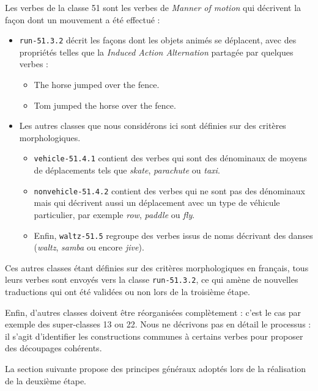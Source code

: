 Les verbes de la classe 51 sont les verbes de \textit{Manner of motion} qui
décrivent la façon dont un mouvement a été effectué :
\begin{itemize}
    \item \texttt{run-51.3.2} décrit les façons dont les objets animés se
        déplacent, avec des propriétés telles que la \textit{Induced Action
        Alternation} partagée par quelques verbes :
        \begin{itemize}
            \item The horse jumped over the fence.
            \item Tom jumped the horse over the fence.
        \end{itemize}
    \item Les autres classes que nous considérons ici sont définies sur des
        critères morphologiques.
        \begin{itemize}
            \item \texttt{vehicle-51.4.1} contient des verbes qui sont des
                dénominaux de moyens de déplacements tels que \textit{skate},
                \textit{parachute} ou \textit{taxi}.
            \item \texttt{nonvehicle-51.4.2} contient des verbes qui ne sont
                pas des dénominaux mais qui décrivent aussi un déplacement avec
                un type de véhicule particulier, par exemple \textit{row},
                \textit{paddle} ou \textit{fly}.
            \item Enfin, \texttt{waltz-51.5} regroupe des verbes issus de noms
                décrivant des danses (\textit{waltz}, \textit{samba} ou encore
                \textit{jive}).
        \end{itemize}
\end{itemize}

Ces autres classes étant définies sur des critères morphologiques en français,
tous leurs verbes sont envoyés vers la classe \texttt{run-51.3.2}, ce qui
amène de nouvelles traductions qui ont été validées ou non lors de la troisième
étape.

Enfin, d'autres classes doivent être réorganisées complètement : c'est le cas
par exemple des super-classes 13 ou 22. Nous ne décrivons pas en détail le
processus : il s'agit d'identifier les constructions communes à certains
verbes pour proposer des découpages cohérents.

La section suivante propose des principes généraux adoptés lors de la
réalisation de la deuxième étape.

